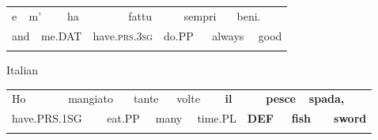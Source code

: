 \begin{tabular}{llllllllllll}
\lsptoprule
e & \multicolumn{2}{l}{m’

} & \multicolumn{2}{l}{ha

} & \multicolumn{2}{l}{fattu

} & \multicolumn{2}{l}{sempri

} & \multicolumn{2}{l}{beni.

} & \\
\multicolumn{2}{l}{and

} & \multicolumn{2}{l}{me.DAT

} & \multicolumn{2}{l}{have.\textsc{prs.3sg}

} & \multicolumn{2}{l}{do.PP

} & \multicolumn{2}{l}{always

} & \multicolumn{2}{l}{good

}\\
\lspbottomrule
\end{tabular}

\begin{styleExLtrTblii}
Italian

\end{styleExLtrTblii}

\begin{tabular}{llllllllllllll}
\lsptoprule
Ho & \multicolumn{2}{l}{mangiato

} & \multicolumn{2}{l}{tante

} & \multicolumn{2}{l}{volte

} & \multicolumn{2}{l}{{\bfseries il}

} & \multicolumn{2}{l}{{\bfseries pesce}

} & \multicolumn{2}{l}{{\bfseries spada,}

} & \\
\multicolumn{2}{l}{have.PRS.1SG

} & \multicolumn{2}{l}{eat.PP

} & \multicolumn{2}{l}{many

} & \multicolumn{2}{l}{time.PL

} & \multicolumn{2}{l}{{\bfseries DEF}

} & \multicolumn{2}{l}{{\bfseries fish}

} & \multicolumn{2}{l}{{\bfseries sword}

}\\
\lspbottomrule
\end{tabular}

